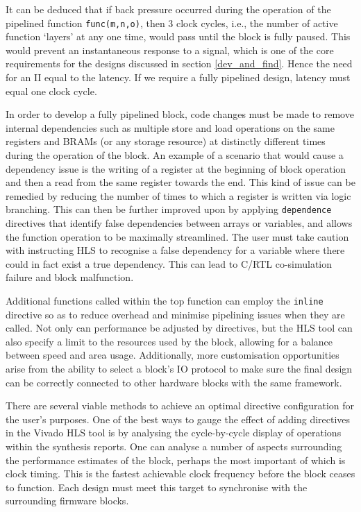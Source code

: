 \documentclass[10pt]{article}
\begin{document}
It can be deduced that if back pressure occurred during the operation of the pipelined function \texttt{func(m,n,o)}, then 3 clock cycles, i.e., the number of active function `layers' at any one time, would pass until the block is fully paused. This would prevent an instantaneous response to a signal, which is one of the core requirements for the designs discussed in section \ref{dev_and_find}. Hence the need for an II equal to the latency. If we require a fully pipelined design, latency must equal one clock cycle.

In order to develop a fully pipelined block, code changes must be made to remove internal dependencies such as multiple store and load operations on the same registers and BRAMs (or any storage resource) at distinctly different times during the operation of the block. An example of a scenario that would cause a dependency issue is the writing of a register at the beginning of block operation and then a read from the same register towards the end. This kind of issue can be remedied by reducing the number of times to which a register is written via logic branching. This can then be further improved upon by applying \texttt{dependence} directives that identify false dependencies between arrays or variables, and allows the function operation to be maximally streamlined. The user must take caution with instructing HLS to recognise a false dependency for a variable where there could in fact exist a true dependency. This can lead to C/RTL co-simulation failure and block malfunction.

Additional functions called within the top function can employ the \texttt{inline} directive so as to reduce overhead and minimise pipelining issues when they are called. Not only can performance be adjusted by directives, but the HLS tool can also specify a limit to the resources used by the block, allowing for a balance between speed and area usage. Additionally, more customisation opportunities arise from the ability to select a block's IO protocol to make sure the final design can be correctly connected to other hardware blocks with the same framework.

There are several viable methods to achieve an optimal directive configuration for the user's purposes. One of the best ways to gauge the effect of adding directives in the Vivado HLS tool is by analysing the cycle-by-cycle display of operations within the synthesis reports. One can analyse a number of aspects surrounding the performance estimates of the block, perhaps the most important of which is clock timing. This is the fastest achievable clock frequency before the block ceases to function. Each design must meet this target to synchronise with the surrounding firmware blocks.
\end{document}
